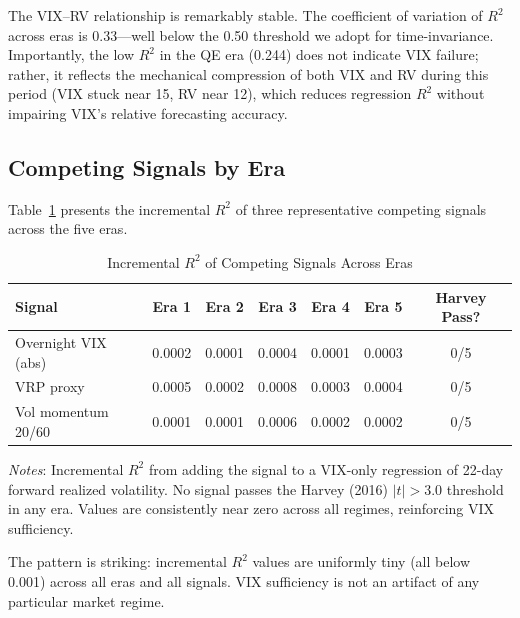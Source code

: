 \documentclass[12pt,a4paper]{article}
\begin{document}
The VIX--RV relationship is remarkably stable. The coefficient of variation of $R^2$ across eras is 0.33---well below the 0.50 threshold we adopt for time-invariance. Importantly, the low $R^2$ in the QE era (0.244) does not indicate VIX failure; rather, it reflects the mechanical compression of both VIX and RV during this period (VIX stuck near 15, RV near 12), which reduces regression $R^2$ without impairing VIX's relative forecasting accuracy.

\subsection{Competing Signals by Era}

Table~\ref{tab:competing_eras} presents the incremental $R^2$ of three representative competing signals across the five eras.

\begin{table}[H]
\centering
\small
\begin{threeparttable}
\caption{Incremental $R^2$ of Competing Signals Across Eras}
\label{tab:competing_eras}
\begin{tabular}{@{}lcccccc@{}}
\toprule
Signal & Era 1 & Era 2 & Era 3 & Era 4 & Era 5 & Harvey Pass? \\
\midrule
Overnight VIX (abs) & 0.0002 & 0.0001 & 0.0004 & 0.0001 & 0.0003 & 0/5 \\
VRP proxy & 0.0005 & 0.0002 & 0.0008 & 0.0003 & 0.0004 & 0/5 \\
Vol momentum 20/60 & 0.0001 & 0.0001 & 0.0006 & 0.0002 & 0.0002 & 0/5 \\
\bottomrule
\end{tabular}
\begin{tablenotes}
\small
\item \textit{Notes}: Incremental $R^2$ from adding the signal to a VIX-only regression of 22-day forward realized volatility. No signal passes the Harvey (2016) $|t|>3.0$ threshold in any era. Values are consistently near zero across all regimes, reinforcing VIX sufficiency.
\end{tablenotes}
\end{threeparttable}
\end{table}

The pattern is striking: incremental $R^2$ values are uniformly tiny (all below 0.001) across all eras and all signals. VIX sufficiency is not an artifact of any particular market regime.
\end{document}
